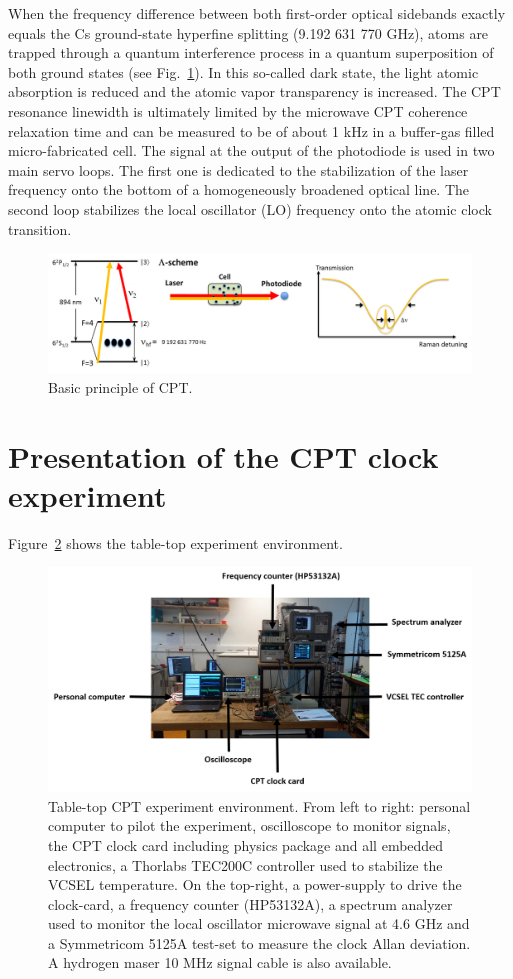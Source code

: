 \documentclass[a4paper,11pt]{article}
\begin{document}
When the frequency difference between both first-order optical sidebands exactly equals the Cs ground-state hyperfine splitting (9.192 631 770 GHz), atoms are trapped through a quantum interference process in a quantum superposition of both ground states (see Fig.~\ref{fig:ppeCPT}). In this so-called dark state, the light atomic absorption is reduced and the atomic vapor transparency is increased. The CPT resonance linewidth is ultimately limited by the microwave CPT coherence relaxation time and can be measured to be of about 1 kHz in a buffer-gas filled micro-fabricated cell. The signal at the output of the photodiode is used in two main servo loops. The first one is dedicated to the stabilization of the laser frequency onto the bottom of a homogeneously broadened optical line. The second loop stabilizes the local oscillator (LO) frequency onto the atomic clock transition.

\begin{figure}[h!]
	\centering
	\includegraphics[width=0.9\linewidth]{ppeCPT}
	\caption{Basic principle of CPT.}
	\label{fig:ppeCPT}
\end{figure}


\section{Presentation of the CPT clock experiment}
Figure~\ref{fig:environnement} shows the table-top experiment environment.

\begin{figure}[h!]
	\centering
	\includegraphics[width=0.9\linewidth]{environnement}
	\caption{Table-top CPT experiment environment. From left to right: personal computer to pilot the experiment, 		oscilloscope to monitor signals, the CPT clock card including physics package and all embedded electronics, a Thorlabs 		TEC200C controller used to stabilize the VCSEL temperature. On the top-right, a power-supply to drive the clock-card, 		a frequency counter (HP53132A), a spectrum analyzer used to monitor the local oscillator microwave signal at 4.6 GHz 		and a Symmetricom 5125A test-set to measure the clock Allan deviation. A hydrogen maser 10 MHz signal cable is also 		available.}
	\label{fig:environnement}
\end{figure}
\end{document}

